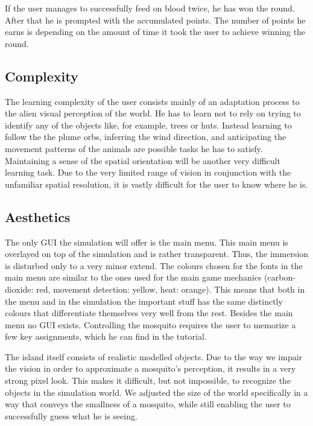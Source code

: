 \documentclass{sig-alternate-05-2015}
\begin{document}
If the user manages to successfully feed on blood twice, he has won the round. After that he is prompted with the accumulated points. The number of points he earns is depending on the amount of time it took the user to achieve winning the round. 


\subsection{Complexity}
\label{sec:complexity}
The learning complexity of the user consists mainly of an adaptation process to the alien visual perception of the world. He has to learn not to rely on trying to identify any of the objects like, for example, trees or huts. Instead learning to follow the the plume orbs, inferring the wind direction, and anticipating the movement patterns of the animals are possible tasks he has to satisfy. Maintaining a sense of the spatial orientation will be another very difficult learning task. Due to the very limited range of vision in conjunction with the unfamiliar spatial resolution, it is vastly difficult for the user to know where he is.

\subsection{Aesthetics}
\label{sec:aesthetics}
The only GUI the simulation will offer is the main menu. This main menu is overlayed on top of the simulation and is rather transparent. Thus, the immersion is disturbed only to a very minor extend. The colours chosen for the fonts in the main menu are similar to the ones used for the main game mechanics (carbon-dioxide: red, movement detection: yellow, heat: orange). This means that both in the menu and in the simulation the important stuff has the same distinctly colours that differentiate themselves very well from the rest.
Besides the main menu no GUI exists. Controlling the mosquito requires the user to memorize a few key assignments, which he can find in the tutorial.

The island itself consists of realistic modelled objects. Due to the way we impair the vision in order to approximate a mosquito's perception, it results in a very strong pixel look. This makes it difficult, but not impossible, to recognize the objects in the simulation world. We adjusted the size of the world specifically in a way that conveys the smallness of a mosquito, while still enabling the user to successfully guess what he is seeing.
\end{document}
